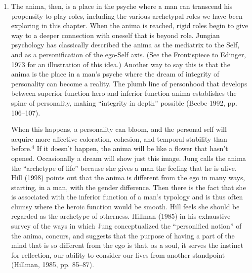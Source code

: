 \begin{enumerate}
It seemed clear to us both that locating his 'old lady,' the anima figure that
represented his reality, had exploded the hipster pretensions of the fictitious
persona he had been hiding behind to make himself more glamorous. Not long
after these dreams, my patient began to engage seriously and no longer
theoretically with his homosexuality and to talk about how he wanted to live
that. He had a dream that his and another man's bodies fitted perfectly
together, and it was clear to him that if he found the suitable partner he
would be entirely comfortable in a homosexual partnership. Not long after this
was clear, he felt ready to terminate. He had a final dream in which he
suffered an injury, called for a medic, and got his wound healed. A follow-up
contact nearly 15 years later revealed that shortly after terminating with me,
he entered into a long-term love relationship with a man that had lasted over a
decade, followed by a break up, and now, he told me, he was in another
long-term relationship with a man that seemed destined to last even longer. He
was clearly comfortable with his life.

\item {} The anima, then, is a place in the
psyche where a man can transcend his propensity to play roles, including the
various archetypal roles we have been exploring in this chapter. When the anima
is reached, rigid roles begin to give way to a deeper connection with oneself
that is beyond role. Jungian psychology has classically described the anima as
the mediatrix to the Self, and as a personification of the ego-Self axis. (See
the Frontispiece to Edinger, 1973 for an illustration of this idea.) Another
way to say this is that the anima is the place in a man's psyche where the
dream of integrity of personality can become a reality. The plumb line of
personhood that develops between superior function hero and inferior function
anima establishes the spine of personality, making ``integrity in depth''
possible (Beebe 1992, pp. 106–107).

When this happens, a personality can bloom, and the personal self will acquire
more affective coloration, cohesion, and temporal stability than before.$^4$ If
it doesn't happen, the anima will be like a flower that hasn't opened.
Occasionally a dream will show just this image. Jung calls the anima the
``archetype of life'' because she gives a man the feeling that he is alive. Hill
(1998) points out that the anima is different from the ego in many ways,
starting, in a man, with the gender difference. Then there is the fact that she
is associated with the inferior function of a man's typology and is thus often
clumsy where the heroic function would be smooth. Hill feels she should be
regarded as the archetype of otherness. Hillman (1985) in his exhaustive survey
of the ways in which Jung conceptualized the ``personified notion'' of the anima,
concurs, and suggests that the purpose of having a part of the mind that is so
different from the ego is that, as a soul, it serves the instinct for
reflection, our ability to consider our lives from another standpoint (Hillman,
1985, pp. 85–87).


\end{enumerate}
